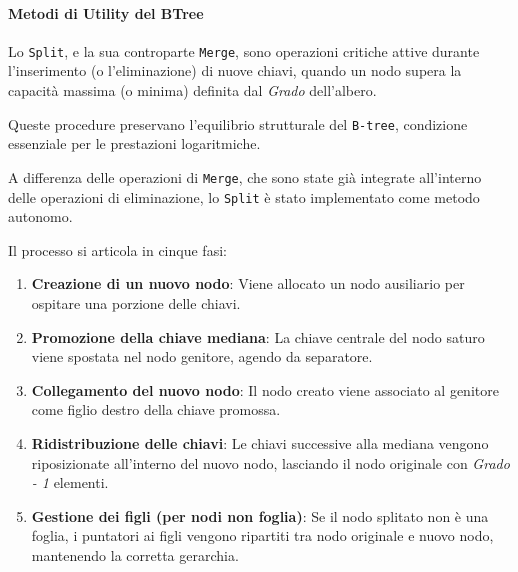 \documentclass[12pt,a4paper,openright,twoside]{book}
\begin{document}
                    

                \paragraph{Metodi di Utility del BTree}

                    Lo \texttt{Split}, e la sua controparte \texttt{Merge}, sono operazioni critiche attive durante l'inserimento (o l'eliminazione) di nuove chiavi, quando un nodo supera la capacità massima (o minima) definita dal \textit{Grado} dell'albero.

                    Queste procedure preservano l'equilibrio strutturale del \texttt{B-tree}, condizione essenziale per le prestazioni logaritmiche.

                    A differenza delle operazioni di \texttt{Merge}, che sono state già integrate all'interno delle operazioni di eliminazione, lo \texttt{Split} è stato implementato come metodo autonomo.

                    \clearpage

                    

                    Il processo si articola in cinque fasi:
                    \begin{enumerate}
                        \item \textbf{Creazione di un nuovo nodo}: Viene allocato un nodo ausiliario per ospitare una porzione delle chiavi.
                        \item \textbf{Promozione della chiave mediana}: La chiave centrale del nodo saturo viene spostata nel nodo genitore, agendo da separatore.
                        \item \textbf{Collegamento del nuovo nodo}: Il nodo creato viene associato al genitore come figlio destro della chiave promossa.
                        \item \textbf{Ridistribuzione delle chiavi}: Le chiavi successive alla mediana vengono riposizionate all'interno del nuovo nodo, lasciando il nodo originale con \textit{Grado - 1} elementi.
                        \item \textbf{Gestione dei figli (per nodi non foglia)}: Se il nodo splitato non è una foglia, i puntatori ai figli vengono ripartiti tra nodo originale e nuovo nodo, mantenendo la corretta gerarchia.
                    \end{enumerate}
\end{document}
